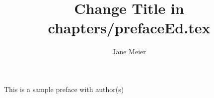 \documentclass[output=paper]{langscibook}
\title{Change Title in chapters/prefaceEd.tex}
\author{%
 Jane Meier  \affiliation{University of Eden}  
}
\begin{document}
\noindent This is a sample preface with author(s)

{\sloppy
\printbibliography[heading=subbibliography,notkeyword=this]
}
\end{document}
